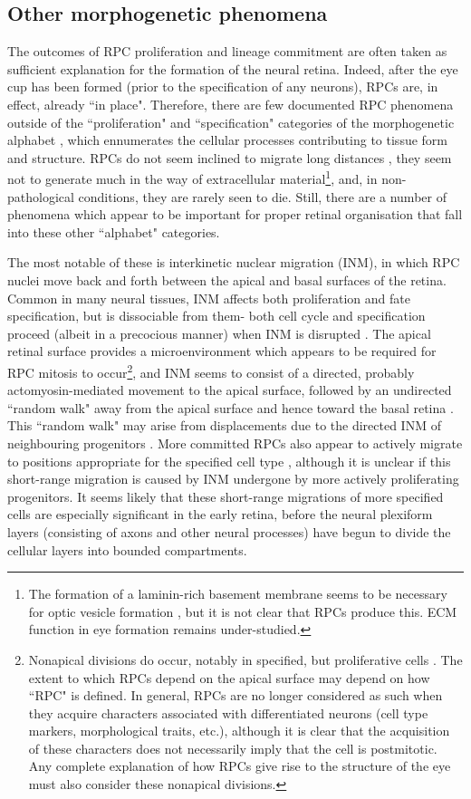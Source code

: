 \documentclass{ut-thesis}
\begin{document}
\begin{NoHyper}
\subsection{Other morphogenetic phenomena}
The outcomes of RPC proliferation and lineage commitment are often taken as sufficient explanation for the formation of the neural retina. Indeed, after the eye cup has been formed (prior to the specification of any neurons), RPCs are, in effect, already ``in place". Therefore, there are few documented RPC phenomena outside of the ``proliferation" and ``specification" categories of the morphogenetic alphabet \cite{Larsen1992}, which ennumerates the cellular processes contributing to tissue form and structure. RPCs do not seem inclined to migrate long distances , they seem not to generate much in the way of extracellular material\footnote{The formation of a laminin-rich basement membrane seems to be necessary for optic vesicle formation \cite{Ivanovitch2013}, but it is not clear that RPCs produce this. ECM function in eye formation remains under-studied.}, and, in non-pathological conditions, they are rarely seen to die. Still, there are a number of phenomena which appear to be important for proper retinal organisation that fall into these other ``alphabet" categories.

The most notable of these is interkinetic nuclear migration (INM), in which RPC nuclei move back and forth between the apical and basal surfaces of the retina. Common in many neural tissues, INM affects both proliferation and fate specification, but is dissociable from them- both cell cycle and specification proceed (albeit in a precocious manner) when INM is disrupted \cite{Murciano2002}. The apical retinal surface provides a microenvironment which appears to be required for RPC mitosis to occur\footnote{Nonapical divisions do occur, notably in specified, but proliferative cells \cite{Godinho2007}. The extent to which RPCs depend on the apical surface may depend on how ``RPC" is defined. In general, RPCs are no longer considered as such when they acquire characters associated with differentiated neurons (cell type markers, morphological traits, etc.), although it is clear that the acquisition of these characters does not necessarily imply that the cell is postmitotic. Any complete explanation of how RPCs give rise to the structure of the eye must also consider these nonapical divisions.}, and INM seems to consist of a directed, probably actomyosin-mediated movement to the apical surface, followed by an undirected ``random walk" away from the apical surface and hence toward the basal retina \cite{Norden2009}. This ``random walk" may arise from displacements due to the directed INM of neighbouring progenitors \cite{Azizi2020}. More committed RPCs also appear to actively migrate to positions appropriate for the specified cell type \cite{Chow2015,Icha2016}, although it is unclear if this short-range migration is caused by INM undergone by more actively proliferating progenitors. It seems likely that these short-range migrations of more specified cells are especially significant in the early retina, before the neural plexiform layers (consisting of axons and other neural processes) have begun to divide the cellular layers into bounded compartments.


\end{NoHyper}
\end{document}
